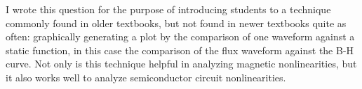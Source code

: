 





I wrote this question for the purpose of introducing students to a technique commonly found in older textbooks, but not found in newer textbooks quite as often: graphically generating a plot by the comparison of one waveform against a static function, in this case the comparison of the flux waveform against the B-H curve.  Not only is this technique helpful in analyzing magnetic nonlinearities, but it also works well to analyze semiconductor circuit nonlinearities.




